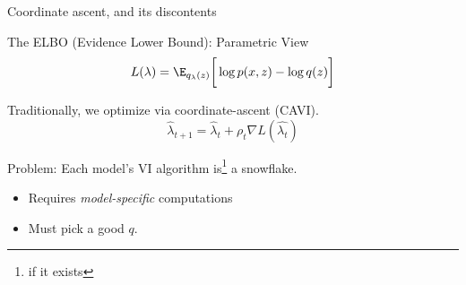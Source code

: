\documentclass[10pt]{beamer}
\begin{document}
\begin{frame}[fragile]{Coordinate ascent, and its discontents}


	\begin{block}{The ELBO (Evidence Lower Bound): Parametric View} 
			\begin{equation*}
			L(\lambda) = \E_{q_\lambda(z)} \bigg[ \log p(x,z) - \log q(z) \bigg]
			\end{equation*}
	
	\end{block}
	
\pause 
%		
		Traditionally, we optimize via coordinate-ascent (CAVI). 
			\begin{equation*}
		\widehat{\lambda}_{t+1} = \widehat{\lambda}_t + \rho_t \nabla L( \widehat{\lambda_t})
			\end{equation*}

\pause 
	\begin{alertblock}{Problem: Each model's VI algorithm is\only<3>\footnote{if it exists} a snowflake.} 
		\begin{itemize}
			\item Requires \textit{model-specific} computations %
			\item Must pick a good $q$.  			
		\end{itemize}
	\end{alertblock}
      
\end{frame}
\end{document}
